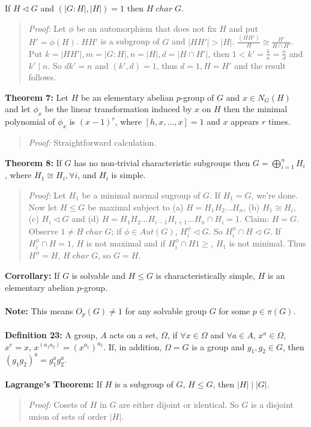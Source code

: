 If $H \lhd G$ and $(|G:H|, |H|)=1$ then $H \; char \; G$.
\begin{quote}
\emph{Proof:}  Let $\phi$ be an automorphism that does not fix $H$ and put $H'= \phi(H)$.
$H H'$ is a subgroup of $G$ and
$|H H'| > |H|$.  ${\frac {(H H')} {H}} \cong {\frac {H'} {H \cap H'}}$.
Put $k= |H H'|, m= |G:H|, n= |H|, d= | H \cap H' |$,  then $ 1 < k'= {\frac {k} {n}} =  {\frac n d}$ and $k' \mid n$.  So $dk'= n$ and $(k', d)=1$,
thus $d=1, H = H'$ and the result follows.
\end{quote}
{\bf Theorem 7:}
Let $H$ be an elementary abelian $p$-group of $G$ and $x \in N_G(H)$ and let $\phi_x$
be the linear transformation induced by $x$ on $H$ then the minimal polynomial of
$\phi_x$ is $(x-1)^r$, where $[h,x, \ldots, x]= 1$ and $x$ appears $r$ times.
\begin{quote}
\emph{Proof:}  Straightforward calculation.
\end{quote}
{\bf Theorem 8:}  If $G$ has no non-trivial characteristic subgroups then
$G= \bigoplus_{i=1}^n H_i$, where $H_1 \cong H_i, \forall i$, and $H_i$ is
simple.
\begin{quote}
\emph{Proof:} Let $H_1$ be a minimal normal sugroup of $G$.  If $H_1 = G$, we're done.
Now let $H \le G$ be maximal subject to (a) $H=H_1 H_2 \ldots H_n$, (b) $H_1 \cong H_i$,
(c) $H_i \lhd G$ and (d)
$H=H_1 H_2 \ldots H_{i-1} H_{i+1} \ldots H_n \cap H_i = 1$.  Claim:  $H=G$.  Observe
$1 \ne H \; char \; G$; if $\phi \in Aut(G)$, $H_i^{\phi} \lhd G$.
So $H_i^{\phi} \cap H \lhd G$.
If $H_i^{\phi} \cap H =1$, $H$ is not maximal and if
$H_i^{\phi} \cap H 1\ge $, $H_1$ is not minimal.
Thus $H^{\phi} = H$, $H \; char \; G$, so $G=H$.
\end{quote}
{\bf Corrollary:} If $G$ is solvable and $H \le G$ is characteristically simple, $H$
is an elementary abelian $p$-group.
\\
\\
{\bf Note:} This means $O_p(G) \ne 1$ for any solvable group $G$ for some $p \in \pi(G)$.
\\
\\
{\bf Definition 23:} A group, $A$ acts on a set, $\Omega$, if $\forall x \in \Omega$ and $\forall a \in A$,
$x^a \in \Omega$, $x^e = x$, $x^{(a_1 a_2)} = (x^{a_1})^{a_2}$. If, in addition, $\Omega = G$ is a group and
$g_1 , g_2 \in G$, then $(g_1 g_2)^a = g_1^a g_2^a$.
\\
\\
{\bf Lagrange's Theorem:}  If $H$ is a subgroup of $G$, $H \leq G$, then $|H| \mid |G|$.
\begin{quote}
\emph{Proof:}
Cosets of $H$ in $G$ are either dijoint or identical.  So $G$ is a disjoint union of sets of order $|H|$.
\end{quote}

